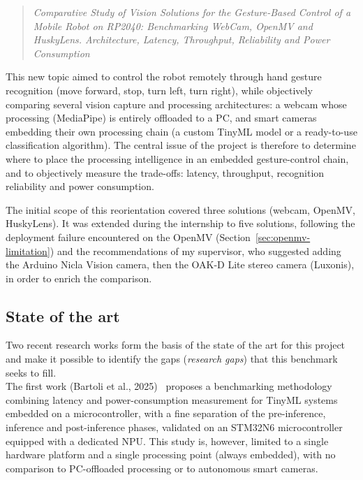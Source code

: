 \documentclass[12pt,a4paper]{report}
\begin{document}
	\begin{quote}
		\itshape Comparative Study of Vision Solutions for the Gesture-Based Control of a Mobile Robot on RP2040: Benchmarking WebCam, OpenMV and HuskyLens. Architecture, Latency, Throughput, Reliability and Power Consumption
	\end{quote}
	
	This new topic aimed to control the robot remotely through hand gesture recognition (move forward, stop, turn left, turn right), while objectively comparing several vision capture and processing architectures: a webcam whose processing (MediaPipe) is entirely offloaded to a PC, and smart cameras embedding their own processing chain (a custom TinyML model or a ready-to-use classification algorithm). The central issue of the project is therefore to determine where to place the processing intelligence in an embedded gesture-control chain, and to objectively measure the trade-offs: latency, throughput, recognition reliability and power consumption.
	
	The initial scope of this reorientation covered three solutions (webcam, OpenMV, HuskyLens). It was extended during the internship to five solutions, following the deployment failure encountered on the OpenMV (Section~\ref{sec:openmv-limitation}) and the recommendations of my supervisor, who suggested adding the Arduino Nicla Vision camera, then the OAK-D Lite stereo camera (Luxonis), in order to enrich the comparison.
	
	\subsection*{State of the art}
	
	Two recent research works form the basis of the state of the art for this project and make it possible to identify the gaps (\textit{research gaps}) that this benchmark seeks to fill.\\
	
	The first work (Bartoli et al., 2025)~\cite{bartoli2025} proposes a benchmarking methodology combining latency and power-consumption measurement for TinyML systems embedded on a microcontroller, with a fine separation of the pre-inference, inference and post-inference phases, validated on an STM32N6 microcontroller equipped with a dedicated NPU.\newline 
	This study is, however, limited to a single hardware platform and a single processing point (always embedded), with no comparison to PC-offloaded processing or to autonomous smart cameras.\\
	
\end{document}
